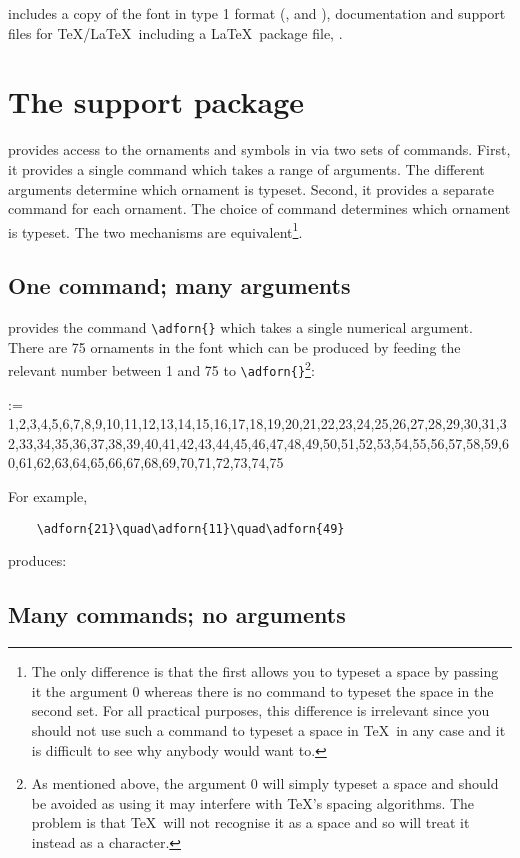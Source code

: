 \documentclass[10pt,british]{article}
\makeatletter
\newcommand{\adfornset}{%
1,2,3,4,5,6,7,8,9,10,11,12,13,14,15,16,17,18,19,20,21,22,23,24,25,26,27,28,29,30,31,32,33,34,35,36,37,38,39,40,41,42,43,44,45,46,47,48,49,50,51,52,53,54,55,56,57,58,59,60,61,62,63,64,65,66,67,68,69,70,71,72,73,74,75}
\newcommand{\adfornshow}{%
	\def\tempa{75}%
	\@for \xx:=\adfornset \do {%
		\ifx\xx\tempa
			\xx: \adforn{\xx}%
		\else
			\xx: \adforn{\xx}\\%
		\fi}}
\makeatother
\begin{document}
 includes a copy of the font in type 1 format (,  and ), documentation and support files for \TeX/\LaTeX\, including a \LaTeX\ package file, .

\section{The support package}\label{sec:support}

 provides access to the ornaments and symbols in  via two sets of commands. First, it provides a single command which takes a range of arguments. The different arguments determine which ornament is typeset. Second, it provides a separate command for each ornament. The choice of command determines which ornament is typeset. The two mechanisms are equivalent\footnote{The only difference is that the first allows you to typeset a space by passing it the argument 0 whereas there is no command to typeset the space in the second set. For all practical purposes, this difference is irrelevant since you should not use such a command to typeset a space in \TeX\ in any case and it is difficult to see why anybody would want to.}.

\subsection{One command; many arguments}

 provides the command \verb|\adforn{}| which takes a single numerical argument. There are 75 ornaments in the font which can be produced by feeding the relevant number between 1 and 75 to \verb|\adforn{}|\footnote{As mentioned above, the argument 0 will simply typeset a space and should be avoided as using it may interfere with \TeX's spacing algorithms. The problem is that \TeX\ will not recognise it as a space and so will treat it instead as a character.}:
\begin{multicols}{5}	%
	\adfornshow
\end{multicols}
For example,
\begin{verbatim}
	\adforn{21}\quad\adforn{11}\quad\adforn{49}
\end{verbatim}
produces:
\begin{center}
	\quad{}\quad{}
\end{center}	

\subsection{Many commands; no arguments}
\end{document}
